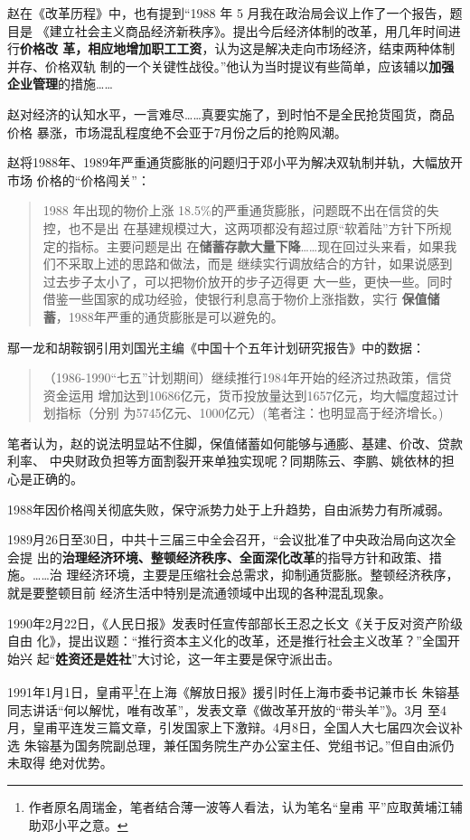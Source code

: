 赵在《改革历程》中，也有提到“1988 年 5 月我在政治局会议上作了一个报告，题目是
《建立社会主义商品经济新秩序》。提出今后经济体制的改革，用几年时间进行\textbf{价格改
  革，相应地增加职工工资}，认为这是解决走向市场经济，结束两种体制并存、价格双轨
制的一个关键性战役。”他认为当时提议有些简单，应该辅以\textbf{加强企业管理}的措施……

赵对经济的认知水平，一言难尽……真要实施了，到时怕不是全民抢货囤货，商品价格
暴涨，市场混乱程度绝不会亚于7月份之后的抢购风潮。

赵将1988年、1989年严重通货膨胀的问题归于邓小平为解决双轨制并轨，大幅放开市场
价格的“价格闯关”：
\begin{quotation}
  1988 年出现的物价上涨 18.5\%的严重通货膨胀，问题既不出在信贷的失控，也不是出
  在基建规模过大，这两项都没有超过原“软着陆”方针下所规定的指标。主要问题是出
  在\textbf{储蓄存款大量下降}……现在回过头来看，如果我们不采取上述的思路和做法，而是
  继续实行调放结合的方针，如果说感到过去步子太小了，可以把物价放开的步子迈得更
  大一些，更快一些。同时借鉴一些国家的成功经验，使银行利息高于物价上涨指数，实行
  \textbf{保值储蓄}，1988年严重的通货膨胀是可以避免的。\cite[129]{gaigelicheng}
\end{quotation}

鄢一龙和胡鞍钢引用刘国光主编《中国十个五年计划研究报告》中的数据：
\begin{quotation}
  （1986-1990“七五”计划期间）继续推行1984年开始的经济过热政策，信贷资金运用
  增加达到10686亿元，货币投放量达到1657亿元，均大幅度超过计划指标（分别
  为5745亿元、1000亿元）(笔者注：也明显高于经济增长。)\cite{shiyiwu}
\end{quotation}

笔者认为，赵的说法明显站不住脚，保值储蓄如何能够与通膨、基建、价改、贷款利率、
中央财政负担等方面割裂开来单独实现呢？同期陈云、李鹏、姚依林的担心是正确的。

1988年因价格闯关彻底失败，保守派势力处于上升趋势，自由派势力有所减弱。

1989月26日至30日，中共十三届三中全会召开，“会议批准了中央政治局向这次全会提
出的\textbf{治理经济环境、整顿经济秩序、全面深化改革}的指导方针和政策、措施。……治
理经济环境，主要是压缩社会总需求，抑制通货膨胀。整顿经济秩序，就是要整顿目前
经济生活中特别是流通领域中出现的各种混乱现象。

1990年2月22日，《人民日报》发表时任宣传部部长王忍之长文《关于反对资产阶级自由
化》，提出议题：“推行资本主义化的改革，还是推行社会主义改革？”全国开始兴
起“\textbf{姓资还是姓社}”大讨论，这一年主要是保守派出击。

1991年1月1日，皇甫平\footnote{作者原名周瑞金，笔者结合薄一波等人看法，认为笔名“皇甫
  平”应取黄埔江辅助邓小平之意。}在上海《解放日报》援引时任上海市委书记兼市长
朱镕基同志讲话“何以解忧，唯有改革”，发表文章《做改革开放的“带头羊”》。3月
至4月，皇甫平连发三篇文章，引发国家上下激辩。4月8日，全国人大七届四次会议补选
朱镕基为国务院副总理，兼任国务院生产办公室主任、党组书记。”但自由派仍未取得
绝对优势。

